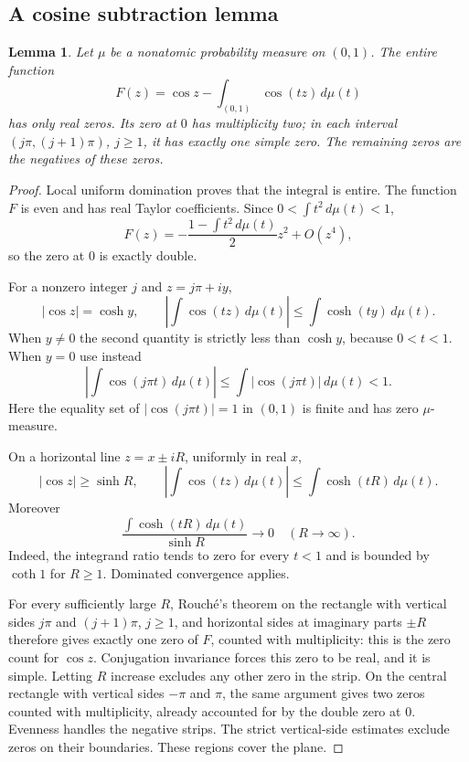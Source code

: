 \documentclass[11pt,a4paper]{article}
\newtheorem{lemma}[theorem]{Lemma}
\theoremstyle{remark}
\begin{document}
\subsection{A cosine subtraction lemma}

\begin{lemma}
Let $\mu$ be a nonatomic probability measure on $(0,1)$.  The entire
function
\[
 F(z)=\cos z-\int_{(0,1)}\cos(tz)\,d\mu(t)
\]
has only real zeros.  Its zero at $0$ has multiplicity two; in each
interval $(j\pi,(j+1)\pi)$, $j\ge1$, it has exactly one simple zero.
The remaining zeros are the negatives of these zeros.
\end{lemma}

\begin{proof}
Local uniform domination proves that the integral is entire.  The
function $F$ is even and has real Taylor coefficients.  Since
$0<\int t^2\,d\mu(t)<1$,
\[
 F(z)=-\frac{1-\int t^2\,d\mu(t)}{2}z^2+O(z^4),
\]
so the zero at $0$ is exactly double.

For a nonzero integer $j$ and $z=j\pi+iy$,
\[
 |\cos z|=\cosh y,
 \qquad
 \left|\int\cos(tz)\,d\mu(t)\right|
       \le\int\cosh(ty)\,d\mu(t).
\]
When $y\ne0$ the second quantity is strictly less than $\cosh y$,
because $0<t<1$.  When $y=0$ use instead
\[
 \left|\int\cos(j\pi t)\,d\mu(t)\right|
 \le\int|\cos(j\pi t)|\,d\mu(t)<1.
\]
Here the equality set of $|\cos(j\pi t)|=1$ in $(0,1)$ is finite and
has zero $\mu$-measure.

On a horizontal line $z=x\pm iR$, uniformly in real $x$,
\[
 |\cos z|\ge\sinh R,
 \qquad
 \left|\int\cos(tz)\,d\mu(t)\right|
       \le\int\cosh(tR)\,d\mu(t).
\]
Moreover
\[
 \frac{\int\cosh(tR)\,d\mu(t)}{\sinh R}\longrightarrow0
       \quad(R\longrightarrow\infty).
\]
Indeed, the integrand ratio tends to zero for every $t<1$ and is bounded
by $\coth1$ for $R\ge1$.  Dominated convergence applies.

For every sufficiently large $R$, Rouch\'e's theorem on the rectangle
with vertical sides $j\pi$ and $(j+1)\pi$, $j\ge1$, and horizontal
sides at imaginary parts $\pm R$ therefore gives exactly one zero of
$F$, counted with multiplicity: this is the zero count for $\cos z$.
Conjugation invariance forces this zero to be real, and it is simple.
Letting $R$ increase excludes any other zero in the strip.  On the
central rectangle with vertical sides $-\pi$ and $\pi$, the same
argument gives two zeros counted with multiplicity, already accounted
for by the double zero at $0$.  Evenness handles the negative strips.
The strict vertical-side estimates exclude zeros on their boundaries.
These regions cover the plane.
\end{proof}
\end{document}
